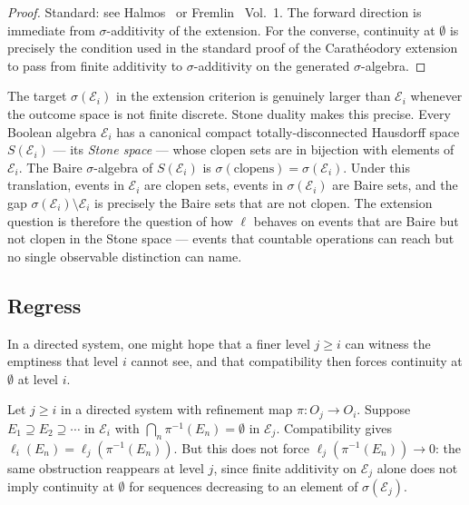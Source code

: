 \begin{proof}
Standard: see Halmos~\cite{Halmos1950} or Fremlin~\cite{Fremlin2003} Vol.~1.
The forward direction is immediate from $\sigma$-additivity of the extension.
For the converse, continuity at $\emptyset$ is precisely the condition used in the
standard proof of the Carath\'{e}odory extension to pass from finite additivity to
$\sigma$-additivity on the generated $\sigma$-algebra.
\end{proof}

\begin{remark}
\label{rem:gap}
The target $\sigma(\mathcal{E}_i)$ in the extension criterion is genuinely larger
than $\mathcal{E}_i$ whenever the outcome space is not finite discrete.  Stone
duality makes this precise.  Every Boolean algebra $\mathcal{E}_i$ has a canonical
compact totally-disconnected Hausdorff space $S(\mathcal{E}_i)$ --- its
\emph{Stone space} --- whose clopen sets are in bijection with elements of
$\mathcal{E}_i$.  The Baire $\sigma$-algebra of $S(\mathcal{E}_i)$ is
$\sigma(\mathrm{clopens}) = \sigma(\mathcal{E}_i)$.  Under this translation,
events in $\mathcal{E}_i$ are clopen sets, events in $\sigma(\mathcal{E}_i)$ are
Baire sets, and the gap $\sigma(\mathcal{E}_i) \setminus \mathcal{E}_i$ is
precisely the Baire sets that are not clopen.  The extension question is therefore
the question of how $\ell$ behaves on events that are Baire but not clopen in the
Stone space --- events that countable operations can reach but no single observable
distinction can name.
\end{remark}

\subsection{Regress}

In a directed system, one might hope that a finer level $j \geq i$ can witness the
emptiness that level $i$ cannot see, and that compatibility then forces continuity at
$\emptyset$ at level $i$.

\begin{proposition}
\label{prop:regress}
Let $j \geq i$ in a directed system with refinement map $\pi : O_j \to O_i$.  Suppose
$E_1 \supseteq E_2 \supseteq \cdots$ in $\mathcal{E}_i$ with
$\bigcap_n \pi^{-1}(E_n) = \emptyset$ in $\mathcal{E}_j$.  Compatibility gives
$\ell_i(E_n) = \ell_j(\pi^{-1}(E_n))$.  But this does not force
$\ell_j(\pi^{-1}(E_n)) \to 0$: the same obstruction reappears at level $j$, since
finite additivity on $\mathcal{E}_j$ alone does not imply continuity at $\emptyset$
for sequences decreasing to an element of $\sigma(\mathcal{E}_j)$.
\end{proposition}

